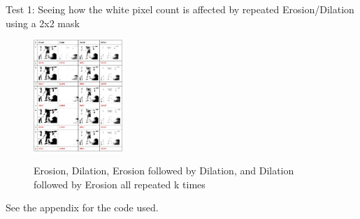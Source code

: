 \documentclass[11pt]{article} %
\begin{document}
Test 1: Seeing how the white pixel count is affected by repeated Erosion/Dilation using a 2x2 mask\\
\begin{figure}
	\vspace{-20pt}
	\begin{center}
		\includegraphics[width=0.3\textwidth]{../images/ImageOps/test1}
		\label{img:erode1}
	\end{center}
	\vspace{-20pt}
	\caption{Erosion, Dilation, Erosion followed by Dilation, and Dilation followed by Erosion all repeated k times}
\end{figure}
See the appendix for the code used.
\end{document}
